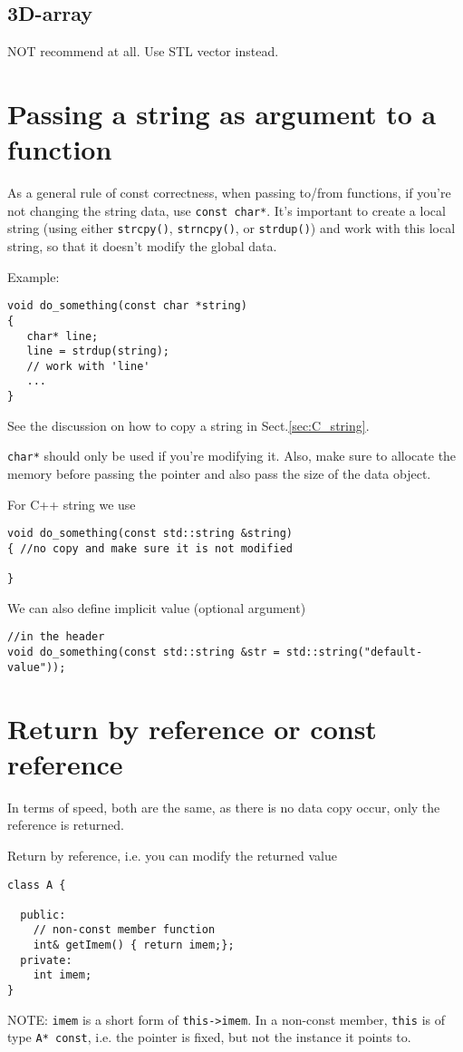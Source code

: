 \subsection{3D-array}

NOT recommend at all. Use STL vector instead.

\section{Passing a string as argument to a function}

As a general rule of const correctness, when passing to/from functions, if
you're not changing the string data, use \verb!const char*!.
It's important to create a local string (using either \verb!strcpy()!,
\verb!strncpy()!, or \verb!strdup()!) and work with this local string, so that
it doesn't modify the global data.

Example:
\begin{verbatim}
void do_something(const char *string)
{
   char* line;
   line = strdup(string);
   // work with 'line'
   ...
}
\end{verbatim}
See the discussion on how to copy a string in Sect.\ref{sec:C_string}.

\verb!char*! should only be used if you're modifying it.
Also, make sure to allocate the memory before passing the pointer and also pass
the size of the data object.

For C++ string we use
\begin{verbatim}
void do_something(const std::string &string)
{ //no copy and make sure it is not modified

}
\end{verbatim}
We can also define implicit value (optional argument)
\begin{verbatim}
//in the header
void do_something(const std::string &str = std::string("default-value"));
\end{verbatim}


\section{Return by reference or const reference}

In terms of speed, both are the same, as there is no data copy occur, only the
reference is returned.

Return by reference, i.e. you can modify the returned value
\begin{lstlisting}
class A {

  public:
    // non-const member function
    int& getImem() { return imem;};
  private:
    int imem;
}
\end{lstlisting}
NOTE: \verb!imem! is a short form of \verb!this->imem!. 
In a non-const member,  \verb!this! is of type \verb!A* const!, i.e. the pointer
is fixed, but not the instance it points to.

